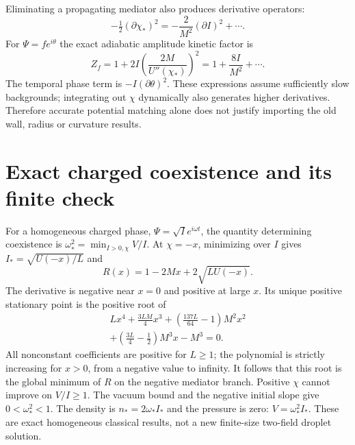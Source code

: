 \documentclass[11pt]{article}
\begin{document}
Eliminating a propagating mediator also produces derivative operators:
\begin{equation}
 -\tfrac12(\partial\chi_*)^2
 =-\frac{2}{M^2}(\partial I)^2+\cdots.
\end{equation}
For $\Psi=f e^{i\theta}$ the exact adiabatic amplitude kinetic factor is
\begin{equation}
 Z_f=1+2I\left(\frac{2M}{U''(\chi_*)}\right)^2
 =1+\frac{8I}{M^2}+\cdots.
 \label{uv:kinetic}
\end{equation}
The temporal phase term is $-I(\partial\theta)^2$. These expressions
assume sufficiently slow backgrounds; integrating out $\chi$ dynamically
also generates higher derivatives. Therefore accurate potential matching
alone does not justify importing the old wall, radius or curvature results.

\section{Exact charged coexistence and its finite check}
For a homogeneous charged phase, $\Psi=\sqrt I e^{i\omega t}$,
the quantity determining coexistence is
$\omega_*^2=\min_{I>0,\chi}V/I$. At $\chi=-x$, minimizing over $I$
gives $I_*=\sqrt{U(-x)/L}$ and
\begin{equation}
 R(x)=1-2Mx+2\sqrt{L U(-x)}.
\end{equation}
The derivative is negative near $x=0$ and positive at large $x$.
Its unique positive stationary point is the positive root of
\begin{multline}
 Lx^4+\frac{3LM}{4}x^3+
 \left(\frac{137L}{64}-1\right)M^2x^2\\
 +\left(\frac{3L}{4}-\frac12\right)M^3x-M^3=0.
 \label{uv:root}
\end{multline}
All nonconstant coefficients are positive for $L\ge1$; the polynomial
is strictly increasing for $x>0$, from a negative value to infinity.
It follows that this root is the global minimum of $R$ on the negative
mediator branch. Positive $\chi$ cannot improve on $V/I\ge1$.
The vacuum bound and the negative initial slope give
$0<\omega_*^2<1$. The density is $n_*=2\omega_* I_*$ and the pressure
is zero: $V=\omega_*^2 I_*$. These are exact homogeneous classical
results, not a new finite-size two-field droplet solution.
\end{document}
